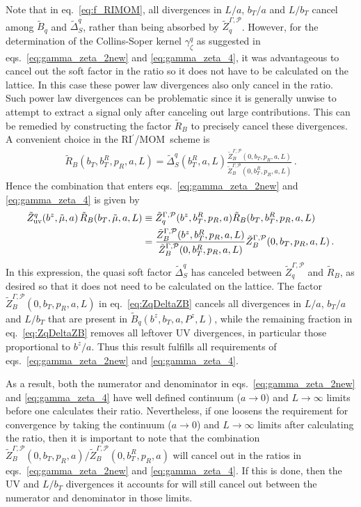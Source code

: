 \documentclass[11pt,a4paper]{article}
\DeclareRobustCommand{\eq}[1]{eq.~\eqref{eq:#1}}
\DeclareRobustCommand{\eqs}[2]{eqs.~\eqref{eq:#1} and \eqref{eq:#2}}
\newcommand{\cP}{\mathcal{P}}
\newcommand{\cR}{{\tilde R}}
\newcommand{\nn}{\nonumber}
\newcommand{\RIpMOM}{RI$^\prime$/MOM}
\begin{document}
Note that in \eq{f_RIMOM}, all divergences in $L/a$, $b_T/a$ and $L/b_T$ cancel among $\tilde B_q$ and $\tilde\Delta_S^q$,
rather than being absorbed by $\tilde Z_q^{\Gamma,\cP}$. However, for the determination of the Collins-Soper kernel $\gamma_\zeta^q$ as suggested in \eqs{gamma_zeta_2new}{gamma_zeta_4}, it was advantageous to cancel out the soft factor in the ratio so it does not have to be calculated on the lattice. In this case these power law divergences also only cancel in the
ratio. Such power law divergences can be problematic since it is generally unwise to attempt to extract a signal only after canceling out large contributions.
This can be remedied by constructing the factor $\cR_B$ to precisely cancel these divergences.
A convenient choice in the \RIpMOM\ scheme is
\begin{align} \label{eq:Delta_ZB}
 \cR_B(b_T,b_T^R,p_R,a,L) = \tilde\Delta_S^q(b_T^R,a,L) \frac{\tilde Z^{\Gamma,\cP}_B(0, b_T, p_R, a, L)}{\tilde Z^{\Gamma,\cP}_B(0, b_T^R, p_R, a, L)}
\,.\end{align}
Hence the combination that enters \eqs{gamma_zeta_2new}{gamma_zeta_4} is given by
\begin{align} \label{eq:ZqDeltaZB}
 \tilde Z_{\rm uv}^q(b^z,\tilde \mu, a) \, \cR_B(b_T,\tilde\mu,a,L)
 &\equiv \tilde Z^{\Gamma,\cP}_q(b^z, b_T^R, p_R, a) \cR_B(b_T,b_T^R,p_R,a,L)
\nn\\&
 = \frac{\tilde Z^{\Gamma,\cP}_B(b^z, b_T^R, p_R, a, L)}{\tilde Z^{\Gamma,\cP}_B(0, b_T^R, p_R, a, L)}
   \tilde Z^{\Gamma,\cP}_B(0, b_T, p_R, a, L)
\,.\end{align}
In this expression, the quasi soft factor $\tilde\Delta_S^q$ has canceled between $\tilde Z^{\Gamma,\cP}_q$ and $\cR_B$,
as desired so that it does not need to be calculated on the lattice. The factor $\tilde Z^{\Gamma,\cP}_B(0, b_T, p_R, a, L)$
in \eq{ZqDeltaZB} cancels all divergences in $L/a$, $b_T/a$ and $L/b_T$ that are present
in $\tilde B_q(b^z,b_T,a,P^z,L)$, while the remaining fraction in \eq{ZqDeltaZB} removes
all leftover UV divergences, in particular those proportional to $b^z/a$. Thus 
this result fulfills all requirements of \eqs{gamma_zeta_2new}{gamma_zeta_4}. 

As a result, both the numerator and denominator in \eqs{gamma_zeta_2new}{gamma_zeta_4} have well defined continuum ($a\to0$) and $L\to\infty$ limits before one calculates their ratio. Nevertheless, if one loosens the requirement for convergence by taking the continuum ($a\to0$) and $L\to\infty$ limits after calculating the ratio, then it is important to note that the combination $\tilde Z^{\Gamma,\cP}_B(0, b_T, p_R, a)/ \tilde Z^{\Gamma,\cP}_B(0, b_T^R, p_R, a)$ will cancel out in the ratios in \eqs{gamma_zeta_2new}{gamma_zeta_4}. If this is done, then the UV and $L/b_T$ divergences it accounts for will still cancel out between the numerator and denominator in those limits.
\end{document}
